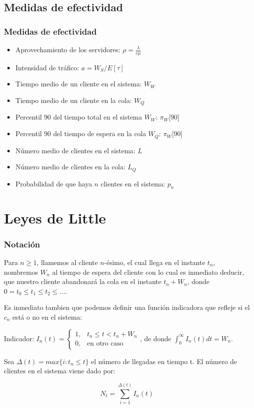 \documentclass[8pt]{beamer}
\begin{document}
  \subsection{Medidas de efectividad}
  \begin{frame}\frametitle{Medidas de efectividad}
    \begin{itemize}
    \item Aprovechamiento de los servidores: $\rho = \frac{\lambda}{c\mu}$
    \item Intensidad de tráfico: $a= W_S/E[\tau]$
    \item Tiempo medio de un cliente en el sistema: $W_W$
    \item Tiempo medio de un cliente en la cola: $W_Q$
    \item Percentil 90 del tiempo total en el sistema $W_W$: $\pi_{W} \lbrack 90 \rbrack$
    \item Percentil 90 del tiempo de espera en la cola $W_Q$: $\pi_{W} \lbrack 90 \rbrack$
    \item Número medio de clientes en el sistema: $L$
    \item Número medio de clientes en la cola: $L_Q$
    \item Probabilidad de que haya $n$ clientes en el sistema: $p_n$
    \end{itemize}
  \end{frame}

  \section{Leyes de Little}
  \begin{frame}\frametitle{Notación}
    Para $n \geq 1$, llamemos al cliente $n$-ésimo, el cual llega en el instante $t_n$, nombremos $W_n$ al tiempo 
    de espera del cliente con lo cual es inmediato deducir, que nuestro cliente abandonará la cola en el instante
    $t_n + W_n$, donde $0 = t_0 \leq t_1 \leq t_2 \leq... $.
    
    Es inmediato tambien que podemos definir una función indicadora que refleje si el $c_n$ está o no en el
    sistema:
    
    Indicador: $I_n(t) = \left\{\begin{array}{cc}
    1, & t_n \leq t <t_n + W_n\\
    0, & \textrm{en otro caso}
    \end{array}\right.$, de donde  $\int_{0}^{\infty} I_n(t)dt=W_n$.
    
    Sea $\Delta(t) = max \{i: t_n \leq t\}$ el número de llegadas en tiempo t. El número de clientes en el sistema
    viene dado por:
    
    \[N_t = \sum_{i=1}^{\Delta(t)} I_n(t)\]
  \end{frame}
\end{document}
